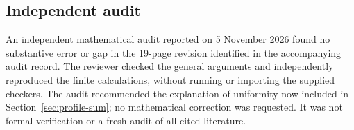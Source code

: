 \subsection{Independent audit}

An independent mathematical audit reported on 5 November 2026
found no substantive error or gap in the 19-page revision identified
in the accompanying audit record. The reviewer checked the general
arguments and independently reproduced the finite calculations,
without running or importing the supplied checkers. The audit
recommended the explanation of uniformity now included in
Section~\ref{sec:profile-sum}; no mathematical correction was requested.
It was not formal verification or a fresh audit of all cited literature.
